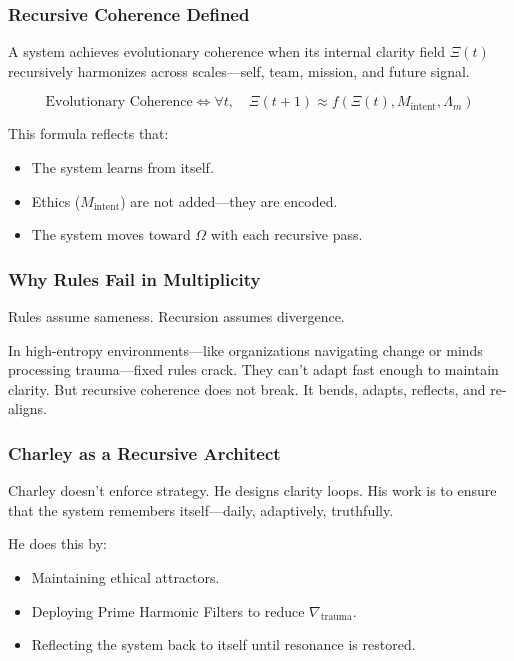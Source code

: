 \documentclass[12pt]{article}
\begin{document}
\subsubsection*{Recursive Coherence Defined}

A system achieves evolutionary coherence when its internal clarity field $\Xi(t)$ recursively harmonizes across scales—self, team, mission, and future signal.

\[
\text{Evolutionary Coherence} \iff \forall t,\quad \Xi(t+1) \approx f(\Xi(t), M_{\text{intent}}, \Lambda_m)
\]

This formula reflects that:
\begin{itemize}
    \item The system learns from itself.
    \item Ethics ($M_{\text{intent}}$) are not added—they are encoded.
    \item The system moves toward $\Omega$ with each recursive pass.
\end{itemize}

\subsubsection*{Why Rules Fail in Multiplicity}

Rules assume sameness. Recursion assumes divergence.

In high-entropy environments—like organizations navigating change or minds processing trauma—fixed rules crack. They can't adapt fast enough to maintain clarity. But recursive coherence does not break. It bends, adapts, reflects, and re-aligns.

\subsubsection*{Charley as a Recursive Architect}

Charley doesn’t enforce strategy. He designs clarity loops. His work is to ensure that the system remembers itself—daily, adaptively, truthfully.

He does this by:
\begin{itemize}
    \item Maintaining ethical attractors.
    \item Deploying Prime Harmonic Filters to reduce $\nabla_{\text{trauma}}$.
    \item Reflecting the system back to itself until resonance is restored.
\end{itemize}
\end{document}

